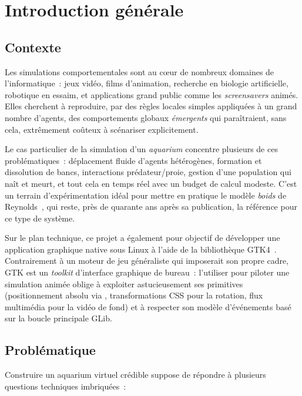 \chapter{Introduction générale}
\label{chap:introduction}

\section{Contexte}

Les simulations comportementales sont au cœur de nombreux domaines de
l'informatique~: jeux vidéo, films d'animation, recherche en biologie
artificielle, robotique en essaim, et applications grand public comme
les \emph{screensavers} animés. Elles cherchent à reproduire, par des
règles locales simples appliquées à un grand nombre d'agents, des
comportements globaux \emph{émergents} qui paraîtraient, sans cela,
extrêmement coûteux à scénariser explicitement.

Le cas particulier de la simulation d'un \emph{aquarium} concentre
plusieurs de ces problématiques~: déplacement fluide d'agents
hétérogènes, formation et dissolution de bancs, interactions
prédateur/proie, gestion d'une population qui naît et meurt, et tout
cela en temps réel avec un budget de calcul modeste. C'est un terrain
d'expérimentation idéal pour mettre en pratique le modèle
\emph{boids} de Reynolds~\cite{reynolds1987flocks}, qui reste, près de
quarante ans après sa publication, la référence pour ce type de
système.

Sur le plan technique, ce projet a également pour objectif de
développer une application graphique native sous Linux à l'aide de la
bibliothèque GTK4~\cite{gtk4docs}. Contrairement à un moteur de jeu
généraliste qui imposerait son propre cadre, GTK est un \emph{toolkit}
d'interface graphique de bureau~: l'utiliser pour piloter une
simulation animée oblige à exploiter astucieusement ses primitives
(positionnement absolu via , transformations CSS pour
la rotation, flux multimédia pour la vidéo de fond) et à respecter
son modèle d'événements basé sur la boucle principale GLib.

\section{Problématique}

Construire un aquarium virtuel crédible suppose de répondre à
plusieurs questions techniques imbriquées~:

